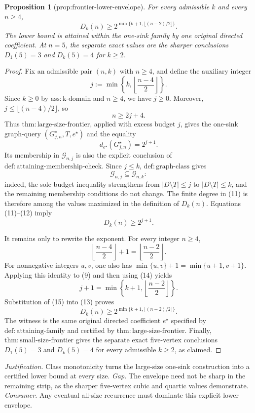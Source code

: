 \documentclass{article}
\newtheorem{proposition}{Proposition}
\begin{document}
\begin{proposition}[prop:frontier-lower-envelope]\label{prop:frontier-lower-envelope}
For every admissible \(k\) and every \(n\geq4\),
\[
 D_k(n)\geq
 2^{\min\{k+1,\lfloor(n-2)/2\rfloor\}}.
\]
The lower bound is attained within the one-sink family by one original directed coefficient. At \(n=5\), the separate exact values are the sharper conclusions \(D_1(5)=3\) and \(D_k(5)=4\) for \(k\geq2\).
\end{proposition}
\begin{proof}
Fix an admissible pair \((n,k)\) with \(n\geq4\), and define the auxiliary integer
\[
 j:=\min\!\left\{k,\left\lfloor\frac{n-4}{2}\right\rfloor\right\}.
\tag{9}
\]
Since \(k\geq0\) by \(\mathrm{ass:k\mbox{-}domain}\) and \(n\geq4\), we have \(j\geq0\).  Moreover, \(j\leq\lfloor(n-4)/2\rfloor\), so
\[
 n\geq2j+4.
\tag{10}
\]
Thus \(\mathrm{thm:large\mbox{-}size\mbox{-}frontier}\), applied with excess budget \(j\), gives the one-sink graph-query \((G^{\star}_{j,n},T,e^{\star})\) and the equality
\[
 d_{e^{\star}}(G^{\star}_{j,n})=2^{j+1}.
\tag{11}
\]
Its membership in \(\mathcal G_{n,j}\) is also the explicit conclusion of \(\mathrm{def:attaining\mbox{-}membership\mbox{-}check}\).  Since \(j\leq k\), \(\mathrm{def:graph\mbox{-}class}\) gives
\[
 \mathcal G_{n,j}\subseteq\mathcal G_{n,k}:
\tag{12}
\]
indeed, the sole budget inequality strengthens from \(|D\setminus T|\leq j\) to \(|D\setminus T|\leq k\), and the remaining membership conditions do not change.  The finite degree in (11) is therefore among the values maximized in the definition of \(D_k(n)\).  Equations (11)--(12) imply
\[
 D_k(n)\geq2^{j+1}.
\tag{13}
\]

It remains only to rewrite the exponent.  For every integer \(n\geq4\),
\[
 \left\lfloor\frac{n-4}{2}\right\rfloor+1
 =\left\lfloor\frac{n-2}{2}\right\rfloor.
\tag{14}
\]
For nonnegative integers \(u,v\), one also has \(\min\{u,v\}+1=\min\{u+1,v+1\}\).  Applying this identity to (9) and then using (14) yields
\[
 j+1
 =\min\!\left\{k+1,\left\lfloor\frac{n-2}{2}\right\rfloor\right\}.
\tag{15}
\]
Substitution of (15) into (13) proves
\[
 D_k(n)\geq
 2^{\min\{k+1,\lfloor(n-2)/2\rfloor\}}.
\]
The witness is the same original directed coefficient \(e^{\star}\) specified by \(\mathrm{def:attaining\mbox{-}family}\) and certified by \(\mathrm{thm:large\mbox{-}size\mbox{-}frontier}\).  Finally, \(\mathrm{thm:small\mbox{-}size\mbox{-}frontier}\) gives the separate exact five-vertex conclusions \(D_1(5)=3\) and \(D_k(5)=4\) for every admissible \(k\geq2\), as claimed.
\end{proof}
\par\smallskip\noindent \textit{Justification.} Class monotonicity turns the large-size one-sink construction into a certified lower bound at every size. \textit{Gap.} The envelope need not be sharp in the remaining strip, as the sharper five-vertex cubic and quartic values demonstrate. \textit{Consumer.} Any eventual all-size recurrence must dominate this explicit lower envelope.
\end{document}
